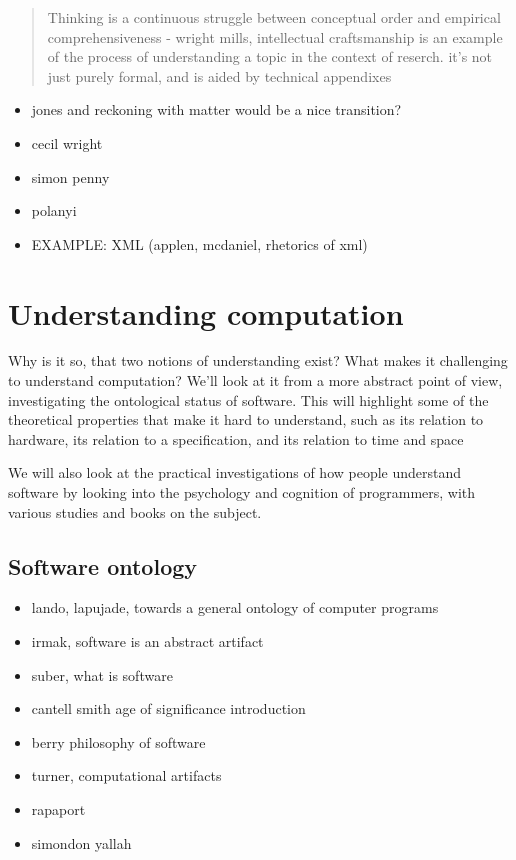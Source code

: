
\begin{quote}
    Thinking is a continuous struggle between conceptual order and empirical comprehensiveness - wright mills, intellectual craftsmanship is an example of the process of understanding a topic in the context of reserch. it's not just purely formal, and is aided by technical appendixes
\end{quote}

\begin{itemize}
    \item jones and reckoning with matter would be a nice transition?
    \item cecil wright
    \item simon penny
    \item polanyi
    \item EXAMPLE: XML (applen, mcdaniel, rhetorics of xml)
\end{itemize}

\section{Understanding computation}

Why is it so, that two notions of understanding exist? What makes it challenging to understand computation? We'll look at it from a more abstract point of view, investigating the ontological status of software. This will highlight some of the theoretical properties that make it hard to understand, such as its relation to hardware, its relation to a specification, and its relation to time and space

We will also look at the practical investigations of how people understand software by looking into the psychology and cognition of programmers, with various studies and books on the subject.


\subsection{Software ontology}

\begin{itemize}
    \item lando, lapujade, towards a general ontology of computer programs
    \item irmak, software is an abstract artifact
    \item suber, what is software
    \item cantell smith age of significance introduction
    \item berry philosophy of software
    \item turner, computational artifacts
    \item rapaport
    \item simondon yallah
\end{itemize}

